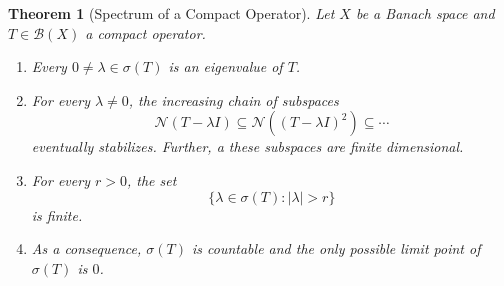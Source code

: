 \documentclass[11pt]{article}
\theoremstyle{thmstyle}
\newtheorem{theorem}{Theorem}[section]
\theoremstyle{defstyle}
\newcommand{\scrB}{\mathscr B}
\newcommand{\scrN}{\mathscr N}
\begin{document}
\begin{theorem}[Spectrum of a Compact Operator]
    Let $X$ be a Banach space and $T\in\scrB(X)$ a compact operator. 
    \begin{enumerate}[label=(\alph*)]
        \item Every $0\ne\lambda\in\sigma(T)$ is an eigenvalue of $T$. 
        \item For every $\lambda\ne 0$, the increasing chain of subspaces 
        \begin{equation*}
            \scrN(T - \lambda I)\subseteq\scrN((T - \lambda I)^2)\subseteq\cdots
        \end{equation*}
        eventually stabilizes. Further, a these subspaces are finite dimensional.
        \item For every $r > 0$, the set 
        \begin{equation*}
            \{\lambda\in\sigma(T)\colon |\lambda| > r\}
        \end{equation*}
        is finite.
        \item As a consequence, $\sigma(T)$ is countable and the only possible limit point of $\sigma(T)$ is $0$.
    \end{enumerate}
\end{theorem}
\end{document}
